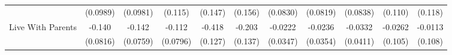 {\begin{tabular}{l*{10}{c}}
            &    (0.0989)         &    (0.0981)         &     (0.115)         &     (0.147)         &     (0.156)         &    (0.0830)         &    (0.0819)         &    (0.0838)         &     (0.110)         &     (0.118)         \\
\addlinespace
Live With Parents&      -0.140         &      -0.142         &      -0.112         &      -0.418\sym{**} &      -0.203         &     -0.0222         &     -0.0236         &     -0.0332         &     -0.0262         &     -0.0113         \\
            &    (0.0816)         &    (0.0759)         &    (0.0796)         &     (0.127)         &     (0.137)         &    (0.0347)         &    (0.0354)         &    (0.0411)         &     (0.105)         &     (0.108)         \\
\bottomrule
\end{tabular}
}
